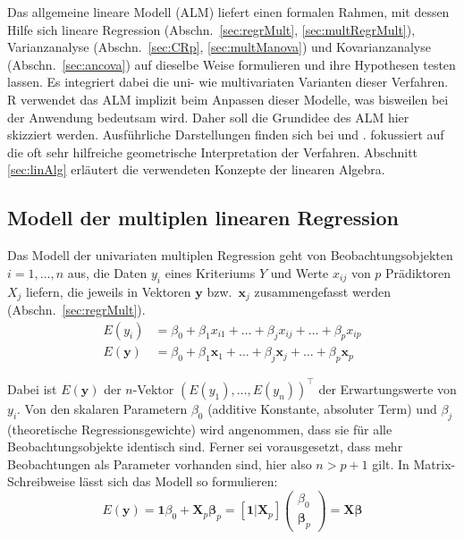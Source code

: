 Das allgemeine lineare Modell (ALM) liefert einen formalen Rahmen, mit dessen Hilfe sich lineare Regression (Abschn.\ \ref{sec:regrMult}, \ref{sec:multRegrMult}), Varianzanalyse (Abschn.\ \ref{sec:CRp}, \ref{sec:multManova}) und Kovarianzanalyse (Abschn.\ \ref{sec:ancova}) auf dieselbe Weise formulieren und ihre Hypothesen testen lassen. Es integriert dabei die uni- wie multivariaten Varianten dieser Verfahren. R verwendet das ALM implizit beim Anpassen dieser Modelle, was bisweilen bei der Anwendung bedeutsam wird. Daher soll die Grundidee des ALM hier skizziert werden. Ausführliche Darstellungen finden sich bei  und .  fokussiert auf die oft sehr hilfreiche geometrische Interpretation der Verfahren. Abschnitt \ref{sec:linAlg} erläutert die verwendeten Konzepte der linearen Algebra.

\subsection{Modell der multiplen linearen Regression}
\label{sec:multALMregr}

Das Modell der univariaten multiplen Regression geht von Beobachtungsobjekten $i = 1, \ldots, n$ aus, die Daten $y_{i}$ eines Kriteriums $Y$ und Werte $x_{ij}$ von $p$ Prädiktoren $X_{j}$ liefern, die jeweils in Vektoren $\bm{y}$ bzw.\ $\bm{x}_{j}$ zusammengefasst werden (Abschn.\ \ref{sec:regrMult}).
\begin{align*}
E(y_{i})  &= \beta_{0} + \beta_{1} x_{i1} + \dots + \beta_{j} x_{ij} + \dots + \beta_{p} x_{ip}\\
E(\bm{y}) &= \beta_{0} + \beta_{1} \bm{x}_{1} + \dots + \beta_{j} \bm{x}_{j} + \dots + \beta_{p} \bm{x}_{p}
\end{align*}

Dabei ist $E(\bm{y})$ der $n$-Vektor $(E(y_{1}), \ldots, E(y_{n}))^{\top}$ der Erwartungswerte von $y_{i}$. Von den skalaren Parametern $\beta_{0}$ (additive Konstante, absoluter Term) und $\beta_{j}$ (theoretische Regressionsgewichte) wird angenommen, dass sie für alle Beobachtungsobjekte identisch sind. Ferner sei vorausgesetzt, dass mehr Beobachtungen als Parameter vorhanden sind, hier also $n > p + 1$ gilt. In Matrix-Schreibweise lässt sich das Modell so formulieren:
\begin{equation*}
E(\bm{y}) = \bm{1} \beta_{0} + \bm{X}_{p} \bm{\beta}_{p} =
[\bm{1}|\bm{X}_{p}] \left(\begin{array}{c} \beta_{0} \\ \bm{\beta}_{p} \end{array}\right) =
\bm{X} \bm{\beta}
\end{equation*}


